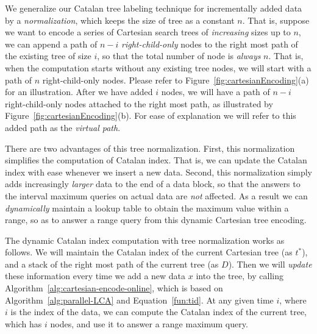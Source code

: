 We generalize our Catalan tree labeling technique for incrementally
added data by a {\em normalization}, which keeps the size of tree as a
constant $n$.  That is, suppose we want to encode a series of
Cartesian search trees of {\em increasing} sizes up to $n$, we can
append a path of $n-i$ {\em right-child-only} nodes to the right most
path of the existing tree of size $i$, so that the total number of
node is {\em always} $n$.  That is, when the computation starts
without any existing tree nodes, we will start with a path of $n$
right-child-only nodes.  Please refer to
Figure~\ref{fig:cartesianEncoding}(a) for an illustration.  After we
have added $i$ nodes, we will have a path of $n - i$ right-child-only
nodes attached to the right most path, as illustrated by
Figure~\ref{fig:cartesianEncoding}(b).  For ease of explanation we
will refer to this added path as the {\em virtual path}.

\begin{figure*}[!thb]
  \centering {}  
  \caption{Normalization of Cartesian trees of increasing sizes by
    adding a virtual path.}
  \label{fig:cartesianEncoding}
\end{figure*}

There are two advantages of this tree normalization.  First, this
normalization simplifies the computation of Catalan index.  That is,
we can update the Catalan index with ease whenever we insert a new
data. Second, this normalization simply adds increasingly {\em
  larger} data to the end of a data block, so that the answers to the
interval maximum queries on actual data are {\em not} affected.  As a
result we can {\em dynamically} maintain a lookup table to obtain the
maximum value within a range, so as to answer a range query from this
dynamic Cartesian tree encoding.


 
The dynamic Catalan index computation with tree normalization works as
follows.  We will maintain the Catalan index of the current Cartesian
tree (as $t^*$), and a stack of the right most path of the current tree
(as $D$).  Then we will {\em update} these information every time we add
a new data $x$ into the tree, by calling
Algorithm~\ref{alg:cartesian-encode-online}, which is based on
Algorithm~\ref{alg:parallel-LCA} and Equation~\ref{fun:tid}.  At any
given time $i$, where $i$ is the index of the data, we can compute the
Catalan index of the current tree, which has $i$ nodes, and use it to
answer a range maximum query.

